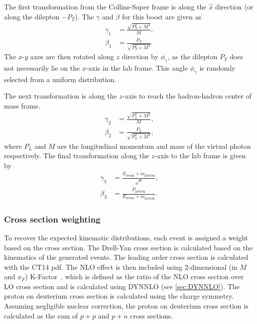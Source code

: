 \documentclass[../main.tex]{subfiles}
\begin{document}
The first transformation from the Collins-Soper frame is along the $\hat{x}$ direction (or along the dilepton $-P_T$).
The $\gamma$ and $\beta$ for this boost are given as
\begin{equation}
	\begin{split}
		\gamma_1 & = \frac{\sqrt{P_T^2 + M^2}}{M},   \\
		\beta_1  & = \frac{P_T}{\sqrt{P_T^2 + M^2}}.
	\end{split}
\end{equation}
The $x$-$y$ axes are then rotated along $z$ direction by $\phi_\gamma$, as the dilepton $P_T$
does not necessarily lie on the $x$-axis in the lab frame.
This angle $\phi_\gamma$ is randomly selected from a uniform distribution.

The next transformation is along the $z$-axis to reach the hadron-hadron center of mass frame.
\begin{equation}
	\begin{split}
		\gamma_2 & = \frac{\sqrt{P_L^2 + M^2}}{M},   \\
		\beta_2  & = \frac{P_T}{\sqrt{P_L^2 + M^2}},
	\end{split}
\end{equation}
where $P_L$ and $M$ are the longitudinal momentum and mass of the virtual photon respectively.
The final transformation along the $z$-axis to the lab frame is given by
\begin{equation}
	\begin{split}
		\gamma_3 & = \frac{E_{\mathrm{beam}}+m_{\mathrm{proton}}}{\sqrt{s}},            \\
		\beta_3  & = \frac{P_{\mathrm{proton}}}{E_{\mathrm{beam}}+m_{\mathrm{proton}}}.
	\end{split}
\end{equation}

\subsubsection{Cross section weighting}
To recover the expected kinematic distributions,
each event is assigned a weight based on the cross section.
The Drell-Yan cross section is calculated based on the kinematics of the generated events.
The leading order cross section is calculated with the CT14 pdf.
The NLO effect is then included using 2-dimensional (in $M$ and $x_F$) K-Factor~\cite{shivangi-1747}, which
is defined as the ratio of the NLO cross section over LO cross section and is
calculated using DYNNLO (see \cref{sec:DYNNLO}).
The proton on deuterium cross section is calculated using the charge symmetry.
Assuming negligible nuclear correction, the proton on deuterium cross section is calculated
as the sum of $p+p$ and $p+n$ cross sections.
\end{document}
